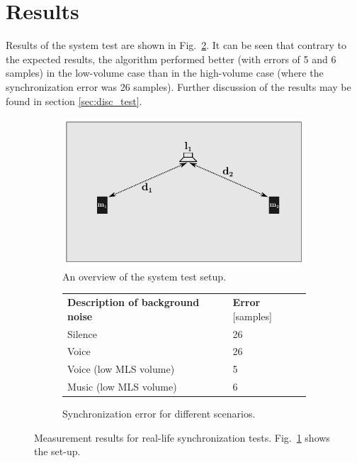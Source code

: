 \documentclass[a4paper, notitlepage]{report}
\begin{document}
\section{Results}
Results of the system test are shown in Fig.~\ref{tab:test-result}. It can be seen that contrary to the expected results, the algorithm performed better (with errors of 5 and 6 samples) in the low-volume case than in the high-volume case (where the synchronization error was 26 samples). Further discussion of the results may be found in section \ref{sec:disc_test}.

\begin{figure}[H]
\begin{adjustwidth}{-1in}{-1in}
\centering
\begin{subfigure}{0.5\textwidth}
	\includegraphics[width=\textwidth]{figures/system_test/setup}
	\caption[Complete system test setup.]{An overview of the system test setup.}
	\label{fig:system_test_setup}
	\end{subfigure}
	\begin{subfigure}{0.5\textwidth}
		\begin{tabular}{l l}
		\textbf{Description of background noise}&\textbf{Error} [samples] \\
		Silence & 26\\
		Voice & 26\\
		Voice (low MLS volume) & 5\\
		Music (low MLS volume) & 6\\
		\end{tabular}
		\caption{Synchronization error for different scenarios.}
		\label{tab:test-result}
	\end{subfigure}
	\caption[Measurement results of synchronization.]{Measurement results for real-life synchronization tests. Fig.~\ref{fig:system_test_setup} shows the set-up.}
\label{fig:system_test_setup_total}
\end{adjustwidth}
\end{figure}
\end{document}

